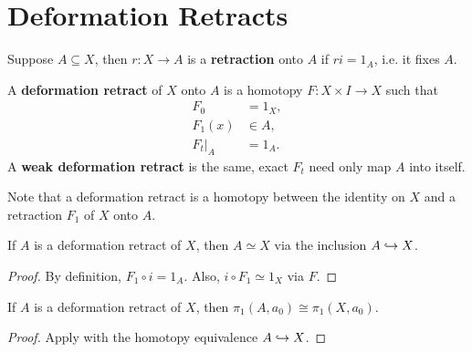\documentclass[twoside,10pt]{report}
\begin{document}
\section{Deformation Retracts}

\begin{defn}[]
	Suppose $A \subseteq X$, then $r:X\to A$ is a \textbf{retraction} onto $A$ if $ri=1_{A}$, i.e. it fixes $A$.
\end{defn}

\begin{defn}[]
	A \textbf{deformation retract} of $X$ onto $A$ is a homotopy $F:X\times I\to X$ such that
	\begin{align*}
		F_0 &= 1_{X}, \\
		F_1(x) &\in A, \\
		F_{t}|_A &= 1_{A}.
	\end{align*}
	A \textbf{weak deformation retract} is the same, exact $F_t$ need only map $A$ into itself.
\end{defn}

Note that a deformation retract is a homotopy between the identity on $X$ and a retraction $F_1$ of $X$ onto $A$.

\begin{prop}
If $A$ is a deformation retract of $X$, then $A \simeq X$ via the inclusion $A \hookrightarrow X$.
\end{prop}
\begin{proof}
	By definition, $F_1 \circ i = 1_{A}$. Also, $i \circ F_1 \simeq 1_{X}$ via $F$.
\end{proof}

\begin{cor}
	If $A$ is a deformation retract of $X$, then $\pi_1(A,a_0) \cong \pi_1(X,a_0)$.
\end{cor}
\begin{proof}
	Apply  with the homotopy equivalence $A \hookrightarrow X$.
\end{proof}


\end{document}
